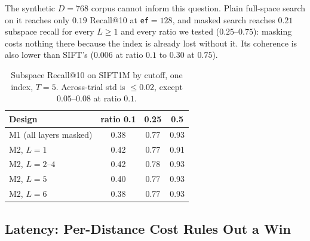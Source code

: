 \documentclass[sigconf,review,balance=false]{acmart}
\begin{document}
The synthetic $D{=}768$ corpus cannot inform this question. Plain full-space
search on it reaches only $0.19$ Recall@10 at \texttt{ef}${=}128$, and masked
search reaches $0.21$ subspace recall for every $L\geq 1$ and every ratio we
tested ($0.25$--$0.75$): masking costs nothing there because the index is
already lost without it. Its coherence is also lower than SIFT's ($0.006$ at
ratio $0.1$ to $0.30$ at $0.75$).

\begin{table}[htbp]
  \centering
  \caption{Subspace Recall@10 on SIFT1M by cutoff, one index, $T{=}5$.
    Across-trial std is $\le 0.02$, except $0.05$--$0.08$ at ratio $0.1$.}
  \label{tab:m2}
  \small
  \begin{tabular}{@{}lccc@{}}
    \hline
    \textbf{Design} & \textbf{ratio 0.1} & \textbf{0.25} & \textbf{0.5} \\
    \hline
    M1 (all layers masked) & 0.38 & 0.77 & 0.93 \\
    M2, $L{=}1$ & 0.42 & 0.77 & 0.91 \\
    M2, $L{=}2$--$4$ & 0.42 & 0.78 & 0.93 \\
    M2, $L{=}5$ & 0.40 & 0.77 & 0.93 \\
    M2, $L{=}6$ & 0.38 & 0.77 & 0.93 \\
    \hline
  \end{tabular}
\end{table}

\subsection{Latency: Per-Distance Cost Rules Out a Win}
\label{sec:eval-latency}
\end{document}
